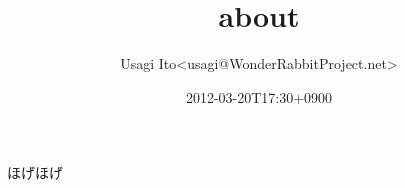 \documentclass[12pt,a4]{article}
\title{about}
\author{Usagi Ito<usagi@WonderRabbitProject.net>}
\date{2012-03-20T17:30+0900}
\begin{document}
ほげほげ
\end{document}
